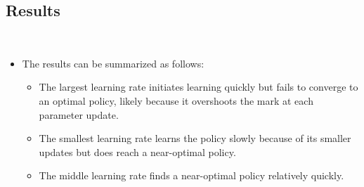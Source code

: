 \documentclass[a4paper]{article}
\begin{document}
\subsection*{Results}
\begin{centering}
    \scalebox{0.6}{} \\
\end{centering}
\begin{itemize}
    \item The results can be summarized as follows:
    \begin{itemize}
        \item The largest learning rate initiates learning quickly
            but fails to converge to an optimal policy, likely because it
            overshoots the mark at each parameter update.
        \item The smallest learning rate learns the policy slowly because of
            its smaller updates but does reach a near-optimal policy.
        \item The middle learning rate finds a near-optimal policy relatively
            quickly.
    \end{itemize}
\end{itemize}
\end{document}
